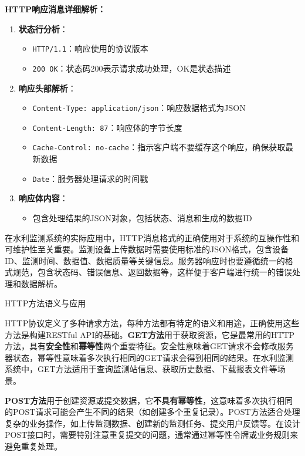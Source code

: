 \textbf{HTTP响应消息详细解析：}

\begin{enumerate}
\def\labelenumi{\arabic{enumi}.}
\tightlist
\item
  \textbf{状态行分析}：

  \begin{itemize}
  \tightlist
  \item
    \texttt{HTTP/1.1}：响应使用的协议版本
  \item
    \texttt{200 OK}：状态码200表示请求成功处理，OK是状态描述
  \end{itemize}
\item
  \textbf{响应头部解析}：

  \begin{itemize}
  \tightlist
  \item
    \texttt{Content-Type: application/json}：响应数据格式为JSON
  \item
    \texttt{Content-Length: 87}：响应体的字节长度
  \item
    \texttt{Cache-Control: no-cache}：指示客户端不要缓存这个响应，确保获取最新数据
  \item
    \texttt{Date}：服务器处理请求的时间戳
  \end{itemize}
\item
  \textbf{响应体内容}：

  \begin{itemize}
  \tightlist
  \item
    包含处理结果的JSON对象，包括状态、消息和生成的数据ID
  \end{itemize}
\end{enumerate}

在水利监测系统的实际应用中，HTTP消息格式的正确使用对于系统的互操作性和可维护性至关重要。监测设备上传数据时需要使用标准的JSON格式，包含设备ID、监测时间、数据值、数据质量等关键信息。服务器响应时也要遵循统一的格式规范，包含状态码、错误信息、返回数据等，这样便于客户端进行统一的错误处理和数据解析。

 HTTP方法语义与应用

HTTP协议定义了多种请求方法，每种方法都有特定的语义和用途，正确使用这些方法是构建RESTful API的基础。\textbf{GET方法}用于获取资源，它是最常用的HTTP方法，具有\textbf{安全性}和\textbf{幂等性}两个重要特征。安全性意味着GET请求不会修改服务器状态，幂等性意味着多次执行相同的GET请求会得到相同的结果。在水利监测系统中，GET方法适用于查询监测站信息、获取历史数据、下载报表文件等场景。

\textbf{POST方法}用于创建资源或提交数据，它\textbf{不具有幂等性}，这意味着多次执行相同的POST请求可能会产生不同的结果（如创建多个重复记录）。POST方法适合处理复杂的业务操作，如上传监测数据、创建新的监测任务、提交用户反馈等。在设计POST接口时，需要特别注意重复提交的问题，通常通过幂等性令牌或业务规则来避免重复处理。

